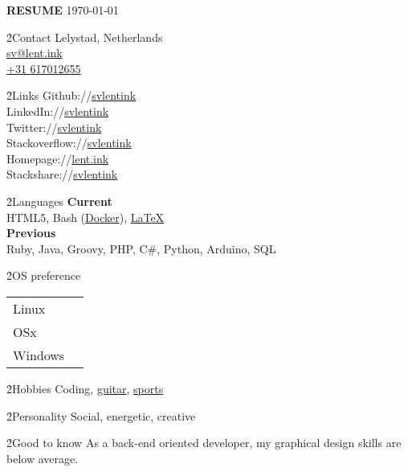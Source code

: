 \LARGE \textbf{RESUME}
\scriptsize \today \normalsize



\h{2}{Contact}{}
Lelystad, Netherlands \\
\href{mailto:sv@lent.ink}{sv@lent.ink} \\
\href{tel:0031617012655}{+31 617012655}

\h{2}{Links}{}
Github://\href{http://github.com/svlentink}{svlentink} \\
LinkedIn://\href{http://linkedin.com/in/svlentink}{svlentink} \\
Twitter://\href{http://twitter.com/svlentink}{svlentink} \\
Stackoverflow://\href{http://stackoverflow.com/users/3037245/svlentink}{svlentink} \\
Homepage://\href{http://lent.ink}{lent.ink} \\
Stackshare://\href{http://stackshare.io/svlentink/lent-ink}{svlentink}

\h{2}{Languages}{}
\textbf{Current} \\
HTML5,
Bash (\href{http://hub.docker.com/r/svlentink}{Docker}),
\href{https://github.com/svlentink/resume}{LaTeX}
\\
\textbf{Previous} \\
Ruby,
Java,
Groovy,
PHP,
C\#,
Python,
Arduino,
SQL

\h{2}{OS preference}{}
\begin{tabu} to  \linewidth { X[l]X[r] }
  Linux &  \\
	OSx &  \\
	Windows & 
\end{tabu}

\h{2}{Hobbies}{}
Coding,
\href{http://svlentink.co.nf/chords}{guitar},
\href{http://svlentink.co.nf/run}{sports}

\h{2}{Personality}{}
Social, energetic, creative

\h{2}{Good to know}{}
As a back-end oriented developer,
my graphical design skills are below average.
